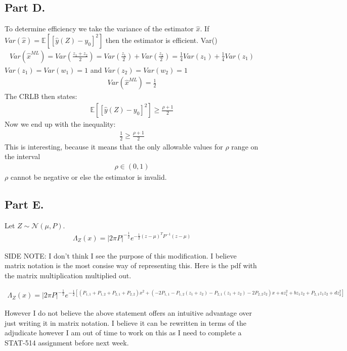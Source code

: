 \documentclass{article}
\begin{document}
\subsection*{Part D.}
To determine efficiency we take the variance of the estimator $\hat{x}$. If $Var(\hat{x}) = \mathbb{E}[[\hat{y}(Z) - y_0]^2]$ then the estimator is efficient.
Var()
\begin{align*}
Var( \hat{x}^{ML} ) = Var( \frac{z_1+z_2}{2} ) = Var( \frac{z_1}{2} ) + Var( \frac{z_2}{2} ) = \frac{1}{4} Var(z_1) + \frac{1}{4} Var(z_1)
\end{align*}
$Var(z_1)=Var(w_1) = 1$ and $Var(z_2)=Var(w_2) = 1$
\begin{align*}
Var( \hat{x}^{ML} ) = \frac{1}{2}
\end{align*}
The CRLB then states:
\begin{align*}
\mathbb{E}[[\hat{y}(Z) - y_0]^2] \geq \frac{\rho+1}{2}
\end{align*}
Now we end up with the inequality:
\begin{align*}
\boxed{ \frac{1}{2} \geq \frac{\rho+1}{2} }
\end{align*}
This is interesting, because it means that the only allowable values for $\rho$ range on the interval 
\begin{align*}
\rho \in (0,1)
\end{align*}
$\rho$ cannot be negative or else the estimator is invalid.
\clearpage

\subsection*{Part E.}
Let $Z \sim \mathcal{N}(\mu, P)$.
\begin{align*}
\boxed{ \Lambda_Z (x) = |2\pi P|^{-\tfrac{1}{2}} e^{-\tfrac{1}{2} (z-\mu)^T P^{-1} (z-\mu)} }
\end{align*}

SIDE NOTE: I don't think I see the purpose of this modification. I believe matrix notation is the most consise way of representing this. Here is the pdf with the matrix multiplication multiplied out.

\begin{align*}
\Lambda_Z(x) = |2\pi P|^{-\tfrac{1}{2}} e^{-\tfrac{1}{2} [(P_{1,1}+P_{1,2}+P_{2,1}+P_{2,2})x^2+(-2P_{1,1} - P_{1,2}(z_1+z_2) - P_{2,1}(z_1+z_2)-2P_{2,2}z_2)x+a z_1^2 + bz_1 z_2 + P_{2,1} z_1 z_2 + d z_2^2]}
\end{align*}

However I do not believe the above statement offers an intuitive advantage over just writing it in matrix notation. I believe it can be rewritten in terms of the adjudicate however I am out of time to work on this as I need to complete a STAT-514 assignment before next week.
\end{document}
